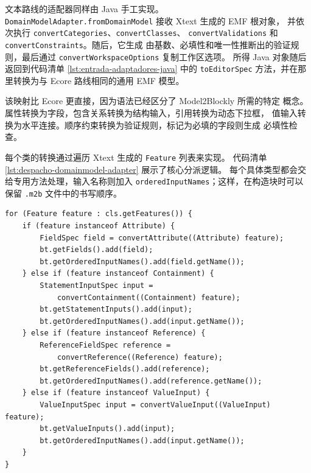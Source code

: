 文本路线的适配器同样由 Java 手工实现。
\texttt{DomainModelAdapter.fromDomainModel} 接收 Xtext 生成的 EMF 根对象，
并依次执行 \texttt{convertCategories}、\texttt{convertClasses}、
\texttt{convertValidations} 和 \texttt{convertConstraints}。随后，它生成
由基数、必填性和唯一性推断出的验证规则，最后通过
\texttt{convertWorkspace}\allowbreak\texttt{Options} 复制工作区选项。
所得 Java 对象随后返回到代码清单 \ref{lst:entrada-adaptadores-java} 中的
\texttt{toEditorSpec} 方法，并在那里转换为与 Ecore 路线相同的通用 EMF
模型。

该映射比 Ecore 更直接，因为语法已经区分了 Model2Blockly 所需的特定
概念。属性转换为字段，包含关系转换为结构输入，引用转换为动态下拉框，
值输入转换为水平连接。顺序约束转换为验证规则，标记为必填的字段则生成
必填性检查。

每个类的转换通过遍历 Xtext 生成的 \texttt{Feature} 列表来实现。
代码清单 \ref{lst:despacho-domainmodel-adapter} 展示了核心分派逻辑。
每个具体类型都会交给专用方法处理，输入名称则加入
\texttt{orderedInputNames}；这样，在构造块时可以保留 \texttt{.m2b}
文件中的书写顺序。

\begin{lstlisting}[style=tfmjava, captionpos=t, caption={\texttt{DomainModelAdapter} 中 DSL 元素的分派}, label={lst:despacho-domainmodel-adapter}]
for (Feature feature : cls.getFeatures()) {
    if (feature instanceof Attribute) {
        FieldSpec field = convertAttribute((Attribute) feature);
        bt.getFields().add(field);
        bt.getOrderedInputNames().add(field.getName());
    } else if (feature instanceof Containment) {
        StatementInputSpec input =
            convertContainment((Containment) feature);
        bt.getStatementInputs().add(input);
        bt.getOrderedInputNames().add(input.getName());
    } else if (feature instanceof Reference) {
        ReferenceFieldSpec reference =
            convertReference((Reference) feature);
        bt.getReferenceFields().add(reference);
        bt.getOrderedInputNames().add(reference.getName());
    } else if (feature instanceof ValueInput) {
        ValueInputSpec input = convertValueInput((ValueInput) feature);
        bt.getValueInputs().add(input);
        bt.getOrderedInputNames().add(input.getName());
    }
}
\end{lstlisting}

